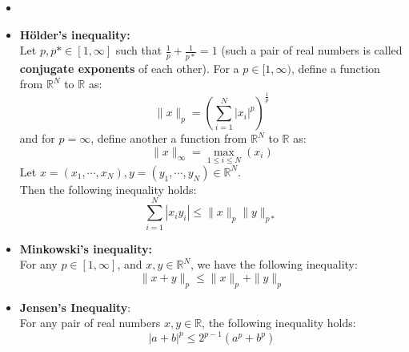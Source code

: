 \begin{recall}
    \begin{itemize}
        \item []
        \item \textbf{H\"older's inequality:}\\ 
            \hypertarget{holder}{Let $p,p*\in[1,\infty]$ such that $\frac{1}{p}+\frac{1}{p*}=1$ (such a pair of real numbers is called \textbf{conjugate exponents} of each other). For a $p\in[1,\infty)$, define a function from $\mathbb{R}^{N}$ to $\mathbb{R}$ as: $$\|x\|_{p}=\left(\sum_{i=1}^{N}|x_{i}|^{p}\right)^{\frac{1}{p}}$$ and for $p=\infty$, define another a function from $\mathbb{R}^{N}$ to $\mathbb{R}$ as: $$\|x\|_{\infty}=\max_{1\leq i\leq N}(x_{i})$$
                Let $x=(x_{1},\cdots,x_{N}),y=(y_{1},\cdots,y_{N})\in \mathbb{R}^{N}$.\\
            Then the following inequality holds: $$\sum_{i=1}^{N}|x_{i}y_{i}|\leq\|x\|_{p}\|y\|_{p*}$$}
        \item \textbf{Minkowski's inequality:}\\ 
            \hypertarget{minkowski}{For any $p\in[1,\infty]$, and $x,y\in \mathbb{R}^{N}$, we have the following inequality: $$\|x+y\|_{p}\leq\|x\|_{p}+\|y\|_{p}$$}
        \item \textbf{Jensen's Inequality}:\\ 
            \hypertarget{jensen}{For any pair of real numbers $x,y\in \mathbb{R}$, the following inequality holds: $$|a+b|^{p}\leq2^{p-1}(a^{p}+b^{p})$$}
    \end{itemize}

\end{recall}

